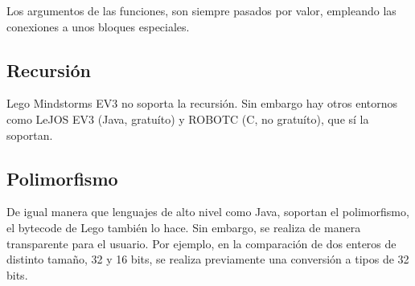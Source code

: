 \documentclass[12pt,a4paper]{article}
\begin{document}
Los argumentos de las funciones, son siempre pasados por valor, empleando las 
conexiones a unos bloques especiales.

\subsection{Recursión}
Lego Mindstorms EV3 no soporta la recursión. Sin embargo hay otros entornos como  
LeJOS EV3 (Java, gratuíto) y ROBOTC (C, no gratuíto), que sí la soportan.

\subsection{Polimorfismo}
De igual manera que lenguajes de alto nivel como Java, soportan el polimorfismo, 
el bytecode de Lego también lo hace. Sin embargo, se realiza de manera 
transparente para el usuario. Por ejemplo, en la comparación de dos enteros de 
distinto tamaño, 32 y 16 bits, se realiza previamente una conversión a tipos de 
32 bits.
\end{document}
